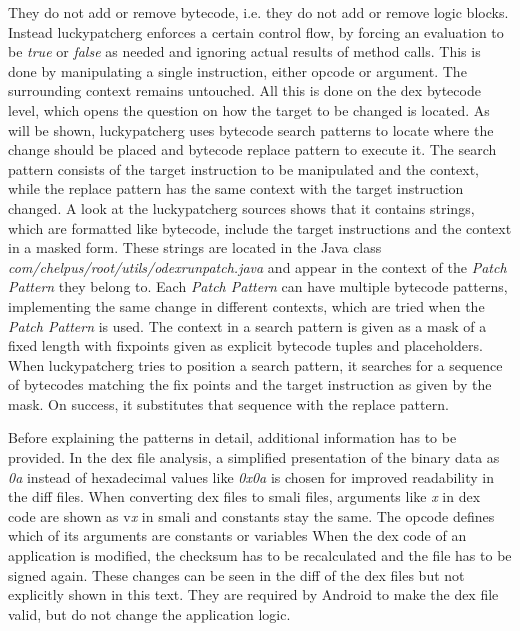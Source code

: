 They do not add or remove bytecode, i.e. they do not add or remove logic blocks.
Instead \gls{luckypatcherg} enforces a certain control flow, by forcing an evaluation to be \textit{true} or \textit{false} as needed and ignoring actual results of method calls.
This is done by manipulating a single instruction, either opcode or argument.
The surrounding context remains untouched.
\newline
All this is done on the dex bytecode level, which opens the question on how the target to be changed is located.
As will be shown, \gls{luckypatcherg} uses bytecode search patterns to locate where the change should be placed and bytecode replace pattern to execute it.
\newline
The search pattern consists of the target instruction to be manipulated and the context, while the replace pattern has the same context with the target instruction changed.
A look at the \gls{luckypatcherg} sources shows that it contains strings, which are formatted like bytecode, include the target instructions and the context in a masked form.
These strings are located in the Java class \textit{com/chelpus/root/utils/odexrunpatch.java} and appear in the context of the \textit{Patch Pattern} they belong to.
Each \textit{Patch Pattern} can have multiple bytecode patterns, implementing the same change in different contexts, which are tried when the \textit{Patch Pattern} is used.
\newline
The context in a search pattern is given as a mask of a fixed length with fixpoints given as explicit bytecode tuples and placeholders.
When \gls{luckypatcherg} tries to position a search pattern, it searches for a sequence of bytecodes matching the fix points and the target instruction as given by the mask.
On success, it substitutes that sequence with the replace pattern.
\newline
\newline

Before explaining the patterns in detail, additional information has to be provided.
In the \gls{dex} file analysis, a simplified presentation of the binary data as \textit{0a} instead of hexadecimal values like \textit{0x0a} is chosen for improved readability in the diff files.
When converting \gls{dex} files to smali files, arguments like \textit{x} in dex code are shown as  v\textit{x} in smali and constants stay the same.
The opcode defines which of its arguments are constants or variables
\newline
\newline
When the dex code of an application is modified, the checksum has to be recalculated and the file has to be signed again.
These changes can be seen in the diff of the dex files but not explicitly shown in this text.
They are required by Android to make the \gls{dex} file valid, but do not change the application logic.

